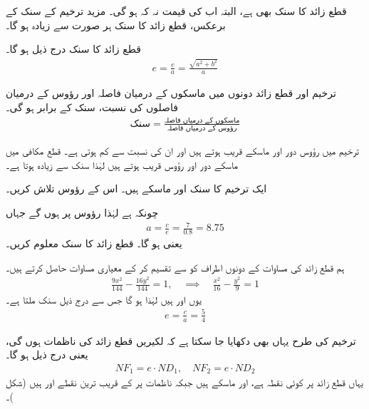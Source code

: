 قطع زائد کا سنک بھی  ہے، البتہ اب  کی قیمت    نہ کہ  ہو گی۔ مزید ترخیم کے سنک کے برعکس،  قطع زائد کا سنک ہر صورت  سے زیادہ ہو گا۔

قطع زائد  کا  سنک درج ذیل ہو گا۔
\begin{align*}
e=\frac{c}{a}=\frac{\sqrt{a^2+b^2}}{a}
\end{align*}

ترخیم اور قطع زائد دونوں میں ماسکوں کے درمیان  فاصلہ اور رؤوس  کے  درمیان  فاصلوں کی نسبت، سنک کے برابر ہو گی۔
\begin{align*}
\text{سنک}=\frac{\text{ماسکوں کے درمیان فاصلہ}}{\text{رؤوس کے درمیان  فاصلہ}}
\end{align*}  

ترخیم میں رؤوس دور اور ماسکے قریب ہوتے ہیں اور ان کی نسبت  سے کم ہوتی ہے۔ قطع مکافی میں ماسکے دور اور  رؤوس  قریب ہوتے ہیں لہٰذا سنک  سے زیادہ ہوتا ہے۔ 

ایک ترخیم کا سنک  اور ماسکے  ہیں۔ اس کے رؤوس  تلاش کریں۔

چونکہ  ہے لہٰذا رؤوس   پر ہوں گے جہاں
\begin{align*}
a=\frac{c}{e}=\frac{7}{0.8}=8.75
\end{align*}
یعنی  ہو گا۔
قطع زائد  کا سنک معلوم کریں۔

ہم قطع زائد کی مساوات کے دونوں اطراف کو  سے تقسیم کر کے معیاری مساوات حاصل کرتے ہیں۔
\begin{align*}
\frac{9x^2}{144}-\frac{16y^2}{144}=1,\quad \implies \quad \frac{x^2}{16}-\frac{y^2}{9}=1
\end{align*}
یوں  اور  ہیں  لہٰذا  ہو گا جس سے درج ذیل سنک  ملتا ہے۔
\begin{align*}
e=\frac{c}{a}=\frac{5}{4}
\end{align*}

ترخیم کی طرح یہاں بھی دکھایا جا سکتا ہے کہ لکیریں  قطع زائد کی  ناظمات ہوں گی، یعنی درج ذیل ہو گا۔
\begin{align}\label{مساوات_مخروط_قطع_زائد_ناظمہ_ماسکہ_خاصیت}
NF_1=e\cdot ND_1,\quad NF_2=e\cdot ND_2
\end{align}
یہاں قطع زائد پر  کوئی نقطہ ہے،  اور  ماسکے ہیں جبکہ  ناظمات  پر  کے قریب ترین نقطے   اور  ہیں (شکل )۔ 

